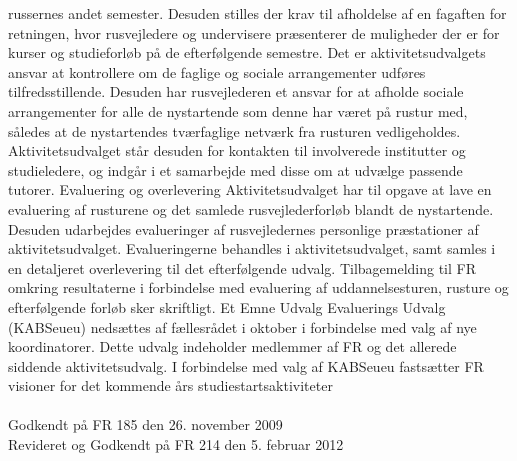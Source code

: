 russernes andet semester.
Desuden stilles der krav til afholdelse af en fagaften for retningen, hvor rusvejledere og undervisere præsenterer de
muligheder der er for kurser og studieforløb på de efterfølgende semestre. Det er aktivitetsudvalgets ansvar at
kontrollere om de faglige og sociale arrangementer udføres tilfredsstillende. Desuden har rusvejlederen et ansvar for at
afholde sociale arrangementer for alle de nystartende som denne har været på rustur med, således at de nystartendes
tværfaglige netværk fra rusturen vedligeholdes. Aktivitetsudvalget står desuden for kontakten til involverede institutter
og studieledere, og indgår i et samarbejde med disse om at udvælge passende tutorer.
Evaluering og overlevering
Aktivitetsudvalget har til opgave at lave en evaluering af rusturene og det samlede rusvejlederforløb blandt de
nystartende. Desuden udarbejdes evalueringer af rusvejledernes personlige præstationer af aktivitetsudvalget.
Evalueringerne behandles i aktivitetsudvalget, samt samles i en detaljeret overlevering til det efterfølgende udvalg.
Tilbagemelding til FR omkring resultaterne i forbindelse med evaluering af uddannelsesturen, rusture og efterfølgende
forløb sker skriftligt. Et Emne Udvalg Evaluerings Udvalg (KABSeueu) nedsættes af fællesrådet i oktober i forbindelse
med valg af nye koordinatorer. Dette udvalg indeholder medlemmer af FR og det allerede siddende aktivitetsudvalg. I
forbindelse med valg af KABSeueu fastsætter FR visioner for det kommende års studiestartsaktiviteter
\\
\\
Godkendt på FR 185 den 26. november 2009\\

Revideret og Godkendt på FR 214 den 5. februar 2012
